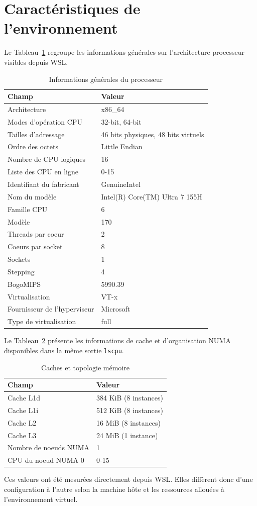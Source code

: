 \section{Caract\'eristiques de l'environnement}

Le Tableau~\ref{tab:cpu-general} regroupe les informations g\'en\'erales sur
l'architecture processeur visibles depuis WSL.

\begin{table}[!t]
\caption{Informations g\'en\'erales du processeur}
\label{tab:cpu-general}
\centering
\small
\begin{tabular}{p{} p{}}
\toprule
\textbf{Champ} & \textbf{Valeur} \\
\midrule
Architecture & x86\_64 \\
Modes d'op\'eration CPU & 32-bit, 64-bit \\
Tailles d'adressage & 46 bits physiques, 48 bits virtuels \\
Ordre des octets & Little Endian \\
Nombre de CPU logiques & 16 \\
Liste des CPU en ligne & 0-15 \\
Identifiant du fabricant & GenuineIntel \\
Nom du mod\`ele & Intel(R) Core(TM) Ultra 7 155H \\
Famille CPU & 6 \\
Mod\`ele & 170 \\
Threads par coeur & 2 \\
Coeurs par socket & 8 \\
Sockets & 1 \\
Stepping & 4 \\
BogoMIPS & 5990.39 \\
Virtualisation & VT-x \\
Fournisseur de l'hyperviseur & Microsoft \\
Type de virtualisation & full \\
\bottomrule
\end{tabular}
\end{table}

Le Tableau~\ref{tab:cpu-cache} pr\'esente les informations de cache et
d'organisation NUMA disponibles dans la m\^eme sortie \texttt{lscpu}.

\begin{table}[!t]
\caption{Caches et topologie m\'emoire}
\label{tab:cpu-cache}
\centering
\small
\begin{tabular}{p{} p{}}
\toprule
\textbf{Champ} & \textbf{Valeur} \\
\midrule
Cache L1d & 384 KiB (8 instances) \\
Cache L1i & 512 KiB (8 instances) \\
Cache L2 & 16 MiB (8 instances) \\
Cache L3 & 24 MiB (1 instance) \\
Nombre de noeuds NUMA & 1 \\
CPU du noeud NUMA 0 & 0-15 \\
\bottomrule
\end{tabular}
\end{table}

Ces valeurs ont \'et\'e mesur\'ees directement depuis WSL. Elles diff\`erent donc
d'une configuration \`a l'autre selon la machine h\^ote et les ressources
allou\'ees \`a l'environnement virtuel.
